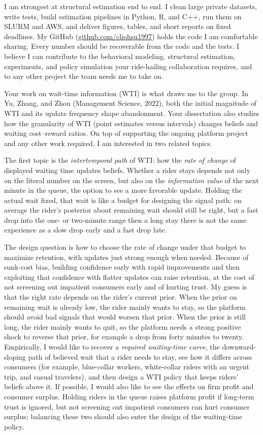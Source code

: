 \documentclass[11pt,letterpaper]{article}
\begin{document}
I am strongest at structural estimation end to end. I clean large private datasets, write tests, build estimation pipelines in Python, R, and C++, run them on SLURM and AWS, and deliver figures, tables, and short reports on fixed deadlines. My GitHub (\href{https://github.com/cliohsu1997}{github.com/cliohsu1997}) holds the code I am comfortable sharing. Every number should be recoverable from the code and the tests. I believe I can contribute to the behavioral modeling, structural estimation, experiments, and policy simulation your ride-hailing collaboration requires, and to any other project the team needs me to take on.

Your work on wait-time information (WTI) is what draws me to the group. In Yu, Zhang, and Zhou (Management Science, 2022), both the initial magnitude of WTI and its update frequency shape abandonment. Your dissertation also studies how the granularity of WTI (point estimates versus intervals) changes beliefs and waiting cost--reward ratios. On top of supporting the ongoing platform project and any other work required, I am interested in two related topics.

The first topic is the \textit{intertemporal path} of WTI: how the \textit{rate of change} of displayed waiting time updates beliefs. Whether a rider stays depends not only on the literal number on the screen, but also on the \textit{information value} of the next minute in the queue, the option to see a more favorable update. Holding the actual wait fixed, that wait is like a budget for designing the signal path: on average the rider's posterior about remaining wait should still be right, but a fast drop into the one- or two-minute range then a long stay there is not the same experience as a slow drop early and a fast drop late.

The design question is how to choose the rate of change under that budget to maximize retention, with updates just strong enough when needed. Because of sunk-cost bias, building confidence early with rapid improvements and then exploiting that confidence with flatter updates can raise retention, at the cost of not screening out impatient consumers early and of hurting trust. My guess is that the right rate depends on the rider's current prior. When the prior on remaining wait is already low, the rider mainly wants to stay, so the platform should avoid bad signals that would worsen that prior. When the prior is still long, the rider mainly wants to quit, so the platform needs a strong positive shock to reverse that prior, for example a drop from forty minutes to twenty. Empirically, I would like to recover a \textit{required waiting-time curve}, the downward-sloping path of believed wait that a rider needs to stay, see how it differs across consumers (for example, blue-collar workers, white-collar riders with an urgent trip, and casual travelers), and then design a WTI policy that keeps riders' beliefs above it. If possible, I would also like to see the effects on firm profit and consumer surplus. Holding riders in the queue raises platform profit if long-term trust is ignored, but not screening out impatient consumers can hurt consumer surplus; balancing these two should also enter the design of the waiting-time policy.
\end{document}
